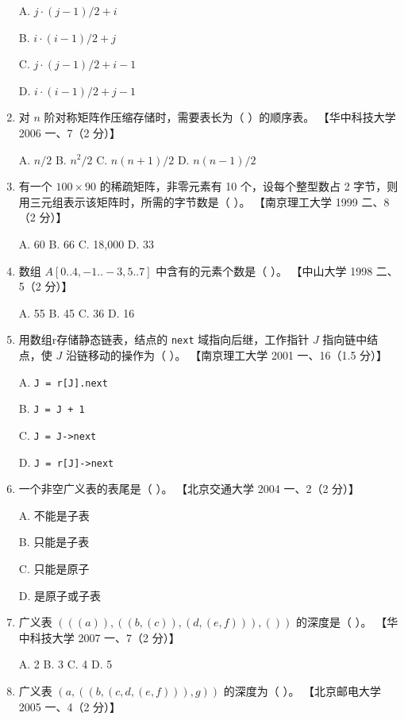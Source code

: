 \documentclass[lang=cn,newtx,10pt,scheme=chinese]{../../elegantbook}
\begin{document}
\begin{enumerate}
    A. $j \cdot (j-1)/2 + i$  

    B. $i \cdot (i-1)/2 + j$  

    C. $j \cdot (j-1)/2 + i - 1$  

    D. $i \cdot (i-1)/2 + j - 1$  

    \item 对 $n$ 阶对称矩阵作压缩存储时，需要表长为（ ）的顺序表。  
    【华中科技大学 2006 一、7（2 分）】  

    A. $n/2$ \quad B. $n^2/2$ \quad C. $n(n+1)/2$ \quad D. $n(n-1)/2$  

    \item 有一个 $100 \times 90$ 的稀疏矩阵，非零元素有 10 个，设每个整型数占 2 字节，则用三元组表示该矩阵时，所需的字节数是（ ）。  
    【南京理工大学 1999 二、8（2 分）】  

    A. 60 \quad B. 66 \quad C. 18,000 \quad D. 33 

    \item 数组 $A[0..4, -1..-3, 5..7]$ 中含有的元素个数是（ ）。  
    【中山大学 1998 二、5（2 分）】  

    A. 55 \quad B. 45 \quad C. 36 \quad D. 16  

    \item 用数组r存储静态链表，结点的 \texttt{next} 域指向后继，工作指针 $J$ 指向链中结点，使 $J$ 沿链移动的操作为（ ）。  
    【南京理工大学 2001 一、16（1.5 分）】  

    A. \texttt{J = r[J].next}  

    B. \texttt{J = J + 1}  

    C. \texttt{J = J->next}  

    D. \texttt{J = r[J]->next}  

    \item 一个非空广义表的表尾是（ ）。  
    【北京交通大学 2004 一、2（2 分）】  

    A. 不能是子表  

    B. 只能是子表  

    C. 只能是原子  

    D. 是原子或子表  

    \item 广义表 $(((a)), ((b, (c)), (d, (e, f))), ())$ 的深度是（ ）。  
    【华中科技大学 2007 一、7（2 分）】  

    A. 2 \quad B. 3 \quad C. 4 \quad D. 5  

    \item 广义表 $(a, ((b, (c, d, (e, f))), g))$ 的深度为（ ）。  
    【北京邮电大学 2005 一、4（2 分）】  


\end{enumerate}
\end{document}
